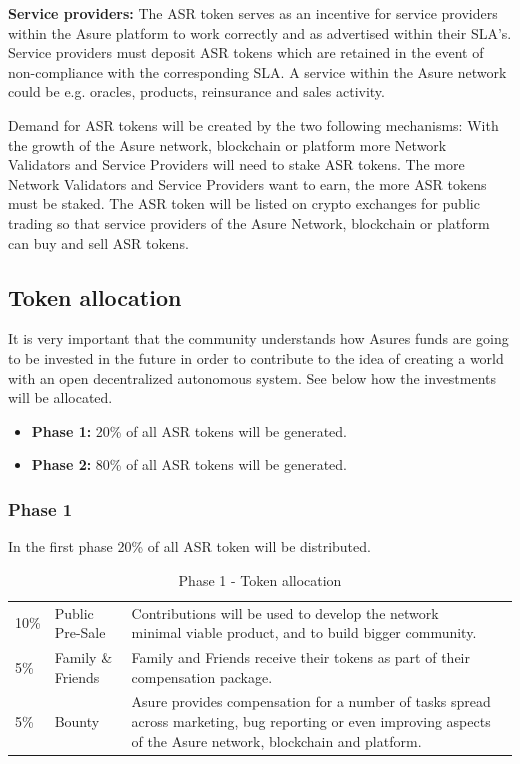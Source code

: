 \textbf{Service providers:}
The ASR token serves as an incentive for service providers within the Asure platform to work correctly and as advertised within their SLA’s. Service providers must deposit ASR tokens which are retained in the event of non-compliance with the corresponding SLA. A service within the Asure network could be e.g. oracles, products, reinsurance and sales activity.\newline

Demand for ASR tokens will be created by the two following mechanisms: With the growth of the Asure network, blockchain or platform more Network Validators and Service Providers will need to stake ASR tokens. The more Network Validators and Service Providers want to earn, the more ASR tokens must be staked.\newline
The ASR token will be listed on crypto exchanges for public trading so that service providers of the Asure Network, blockchain or platform can buy and sell ASR tokens.
\newline\newline



\subsection{Token allocation}

It is very important that the community understands how Asures funds are going to be invested in the future in order to contribute to the idea of creating a world with an open decentralized autonomous system. See below how the investments will be allocated. 

\begin{itemize}
\item \textbf{Phase 1:} 20\% of all ASR tokens will be generated.
\item \textbf{Phase 2:} 80\% of all ASR tokens will be generated.
\end{itemize}

\subsubsection{Phase 1}

In the first phase 20\% of all ASR token will be distributed.

\begin{table}[H]
\begin{tabular}{llp{}l}
  10\% & Public Pre-Sale & Contributions will be used to develop the network minimal viable product, and to build bigger community.\\
  5\% & Family \& Friends & Family and Friends receive their tokens as part of their compensation package.\\
  5\% & Bounty & Asure provides compensation for a number of tasks spread across marketing, bug reporting or even improving aspects of the Asure network, blockchain and platform.
\end{tabular}
\caption{\label{tab:table-name} Phase 1 - Token allocation}
\end{table}

